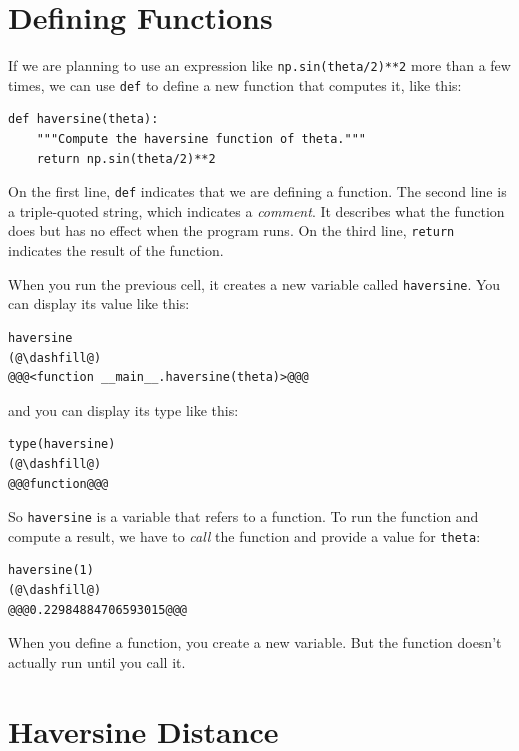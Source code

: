 \hypertarget{defining-functions}{%
\section{Defining Functions}\label{defining-functions}}

If we are planning to use  an expression like
\passthrough{\lstinline!np.sin(theta/2)**2!} more than a few times, we
can use \passthrough{\lstinline!def!} to define a new function that computes it, like this:

\begin{lstlisting}[]
def haversine(theta):
    """Compute the haversine function of theta."""
    return np.sin(theta/2)**2
\end{lstlisting}

On the first line, \passthrough{\lstinline!def!} indicates that we are
defining a function. The second line is a triple-quoted string, which indicates a \emph{comment}. 
It describes what the function does but has no effect when the program
runs. On the third line, \passthrough{\lstinline!return!} indicates the result
of the function.

When you run the previous cell, it creates a new variable called
\passthrough{\lstinline!haversine!}. You can display its value like
this:

\begin{lstlisting}[]
haversine
(@\dashfill@)
@@@<function __main__.haversine(theta)>@@@
\end{lstlisting}
and you can display its type like this:

\begin{lstlisting}[]
type(haversine)
(@\dashfill@)
@@@function@@@
\end{lstlisting}

So \passthrough{\lstinline!haversine!} is a variable that refers to a
function. To run the function and compute a result, we have to
\emph{call} the function and provide a value for
\passthrough{\lstinline!theta!}:

\begin{lstlisting}[]
haversine(1)
(@\dashfill@)
@@@0.22984884706593015@@@
\end{lstlisting}

When you define a function, you create a new variable. But the function
doesn't actually run until you call it.

\hypertarget{haversine-distance}{%
\section{Haversine Distance}\label{haversine-distance}}

